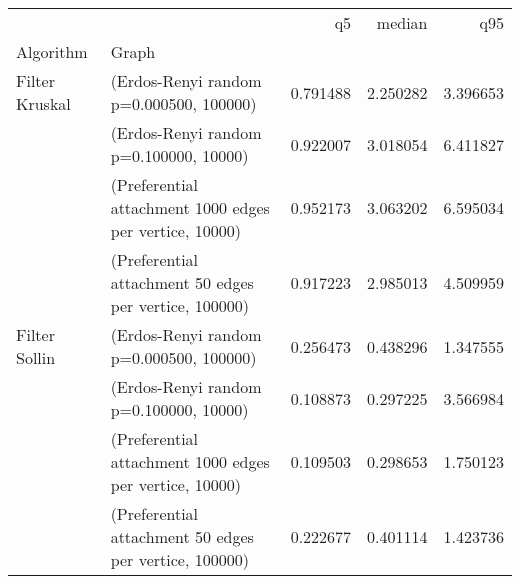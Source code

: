 \begin{tabular}{llrrr}
\toprule
              &                                                        &        q5 &    median &       q95 \\
Algorithm & Graph &           &           &           \\
\midrule
Filter Kruskal & (Erdos-Renyi random p=0.000500, 100000) &  0.791488 &  2.250282 &  3.396653 \\
              & (Erdos-Renyi random p=0.100000, 10000) &  0.922007 &  3.018054 &  6.411827 \\
              & (Preferential attachment 1000 edges per vertice, 10000) &  0.952173 &  3.063202 &  6.595034 \\
              & (Preferential attachment 50 edges per vertice, 100000) &  0.917223 &  2.985013 &  4.509959 \\
Filter Sollin & (Erdos-Renyi random p=0.000500, 100000) &  0.256473 &  0.438296 &  1.347555 \\
              & (Erdos-Renyi random p=0.100000, 10000) &  0.108873 &  0.297225 &  3.566984 \\
              & (Preferential attachment 1000 edges per vertice, 10000) &  0.109503 &  0.298653 &  1.750123 \\
              & (Preferential attachment 50 edges per vertice, 100000) &  0.222677 &  0.401114 &  1.423736 \\
\bottomrule
\end{tabular}
